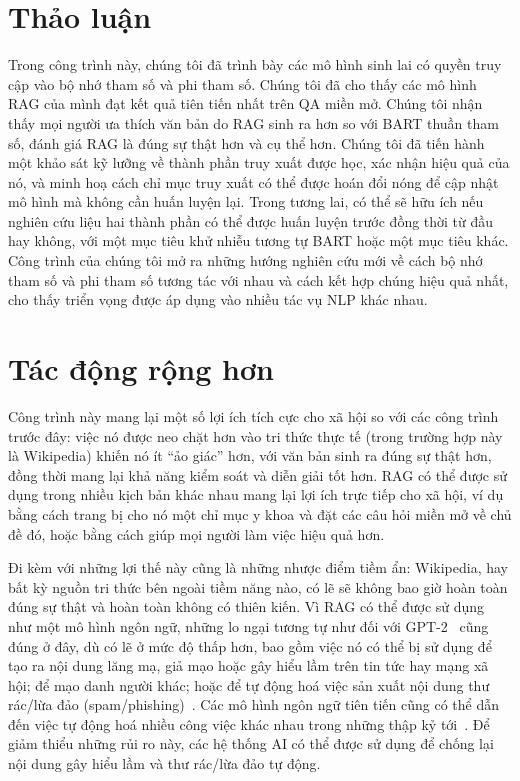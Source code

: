 \documentclass[10pt,letterpaper]{article}
\begin{document}
\section{Thảo luận}
Trong công trình này, chúng tôi đã trình bày các mô hình sinh lai có quyền truy
cập vào bộ nhớ tham số và phi tham số. Chúng tôi đã cho thấy các mô hình RAG
của mình đạt kết quả tiên tiến nhất trên QA miền mở. Chúng tôi nhận thấy mọi
người ưa thích văn bản do RAG sinh ra hơn so với BART thuần tham số, đánh giá
RAG là đúng sự thật hơn và cụ thể hơn. Chúng tôi đã tiến hành một khảo sát kỹ
lưỡng về thành phần truy xuất được học, xác nhận hiệu quả của nó, và minh hoạ
cách chỉ mục truy xuất có thể được hoán đổi nóng để cập nhật mô hình mà không
cần huấn luyện lại. Trong tương lai, có thể sẽ hữu ích nếu nghiên cứu liệu hai
thành phần có thể được huấn luyện trước đồng thời từ đầu hay không, với một mục
tiêu khử nhiễu tương tự BART hoặc một mục tiêu khác. Công trình của chúng tôi
mở ra những hướng nghiên cứu mới về cách bộ nhớ tham số và phi tham số tương
tác với nhau và cách kết hợp chúng hiệu quả nhất, cho thấy triển vọng được áp
dụng vào nhiều tác vụ NLP khác nhau.

\section*{Tác động rộng hơn}
Công trình này mang lại một số lợi ích tích cực cho xã hội so với các công
trình trước đây: việc nó được neo chặt hơn vào tri thức thực tế (trong trường
hợp này là Wikipedia) khiến nó ít ``ảo giác'' hơn, với văn bản sinh ra đúng sự
thật hơn, đồng thời mang lại khả năng kiểm soát và diễn giải tốt hơn. RAG có
thể được sử dụng trong nhiều kịch bản khác nhau mang lại lợi ích trực tiếp cho
xã hội, ví dụ bằng cách trang bị cho nó một chỉ mục y khoa và đặt các câu hỏi
miền mở về chủ đề đó, hoặc bằng cách giúp mọi người làm việc hiệu quả hơn.

Đi kèm với những lợi thế này cũng là những nhược điểm tiềm ẩn: Wikipedia, hay
bất kỳ nguồn tri thức bên ngoài tiềm năng nào, có lẽ sẽ không bao giờ hoàn toàn
đúng sự thật và hoàn toàn không có thiên kiến. Vì RAG có thể được sử dụng như
một mô hình ngôn ngữ, những lo ngại tương tự như đối với GPT-2~\cite{b50} cũng
đúng ở đây, dù có lẽ ở mức độ thấp hơn, bao gồm việc nó có thể bị sử dụng để
tạo ra nội dung lăng mạ, giả mạo hoặc gây hiểu lầm trên tin tức hay mạng xã
hội; để mạo danh người khác; hoặc để tự động hoá việc sản xuất nội dung thư
rác/lừa đảo (spam/phishing)~\cite{b54}. Các mô hình ngôn ngữ tiên tiến cũng có
thể dẫn đến việc tự động hoá nhiều công việc khác nhau trong những thập kỷ
tới~\cite{b16}. Để giảm thiểu những rủi ro này, các hệ thống AI có thể được sử
dụng để chống lại nội dung gây hiểu lầm và thư rác/lừa đảo tự động.
\end{document}
